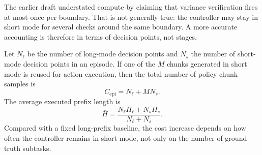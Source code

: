 \documentclass[10pt]{article}
\newcommand{\Hs}{H_s}
\newcommand{\Hl}{H_\ell}
\newcommand{\Msamples}{M}
\begin{document}
The earlier draft understated compute by claiming that variance verification
fires at most once per boundary.
That is not generally true: the controller may stay in short mode for several
checks around the same boundary.
A more accurate accounting is therefore in terms of decision points, not stages.

Let $N_\ell$ be the number of long-mode decision points and $N_s$ the number of
short-mode decision points in an episode.
If one of the $\Msamples$ chunks generated in short mode is reused for action
execution, then the total number of policy chunk samples is
\begin{equation}
  C_{\mathrm{epi}} = N_\ell + \Msamples N_s.
  \label{eq:compute}
\end{equation}
The average executed prefix length is
\begin{equation}
  \bar H = \frac{N_\ell \Hl + N_s \Hs}{N_\ell + N_s}.
  \label{eq:avgH}
\end{equation}
Compared with a fixed long-prefix baseline, the cost increase depends on how
often the controller remains in short mode, not only on the number of ground-truth
subtasks.
\end{document}
